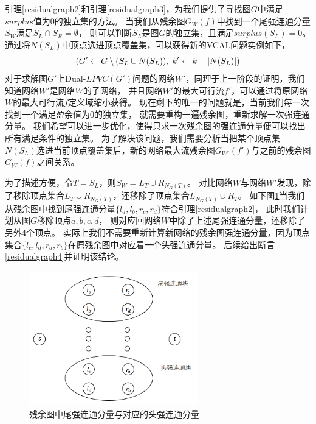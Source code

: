 引理\ref{residualgraph2}和引理\ref{residualgraph3}，为我们提供了寻找图$G$中满足$surplus$值为0的独立集的方法。
当我们从残余图$G_W(f)$中找到一个尾强连通分量$S_W$满足$S_L \cap S_R = \emptyset$，
则可以判断$S_L$是图$G$的独立集，且满足$surplus(S_L) = 0$。
通过将$N(S_L)$中顶点选进顶点覆盖集，可以获得新的VCAL问题实例如下，
\[(G' \leftarrow G \setminus (S_L \cup N(S_L)),\; k' \leftarrow k - \left\vert N(S_L) \right\vert)\]
对于求解图$G'$上Dual-$LPVC(G')$问题的网络$W'$，同理于上一阶段的证明，我们知道网络$W'$是网络$W$的子网络，
并且网络$W'$的最大可行流$f'$，可以通过将原网络$W$的最大可行流$f$定义域缩小获得。
现在剩下的唯一的问题就是，当前我们每一次找到一个满足盈余值为0的独立集，
就需要重构一遍残余图，重新求解一次强连通分量。
我们希望可以进一步优化，使得只求一次残余图的强连通分量便可以找出所有满足条件的独立集。
为了解决该问题，我们需要分析当把某个顶点集$N(S_L)$选进当前顶点覆盖集后，新的网络最大流残余图$G_{W'}(f')$与之前的残余图$G_W(f)$之间关系。

为了描述方便，令$T = S_L$，则$S_W = L_T \cup R_{N_G(T)}$。
对比网络$W$与网络$W'$发现，除了移除顶点集合$L_T \cup R_{N_G(T)}$，还移除了顶点集合$L_{N_G(T)} \cup R_T$。
如下图\ref{fig:mesh1}当我们从残余图中找到尾强连通分量$\{l_a, l_b, r_c, r_d\}$符合引理\ref{residualgraph2}，
此时我们计划从图$G$移除顶点$a, b, c, d$， 则对应回网络$W$中除了上述尾强连通分量，还移除了另外4个顶点。
实际上我们不需要重新计算新网络的残余图强连通分量，因为顶点集合$\{l_c, l_d, r_a, r_b\}$在原残余图中对应着一个头强连通分量。
后续给出断言\ref{residualgraph4}并证明该结论。

\begin{figure}[h]
    \centering
    \includegraphics[width=0.65\textwidth]{eps/1.png}
    \caption{残余图中尾强连通分量与对应的头强连通分量}
    \label{fig:mesh1}
\end{figure}

